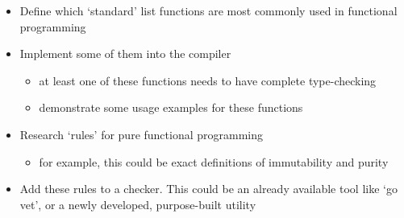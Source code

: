 \begin{itemize}
    \item Define which `standard' list functions are most commonly used in functional programming
    \item Implement some of them into the compiler
    \begin{itemize}
        \item at least one of these functions needs to have complete type-checking
        \item demonstrate some usage examples for these functions
    \end{itemize}
    \item Research `rules' for pure functional programming
    \begin{itemize}
        \item for example, this could be exact definitions of immutability and purity
    \end{itemize}
    \item Add these rules to a checker. This could be an already available tool like `go vet', or a newly
    developed, purpose-built utility
\end{itemize}
